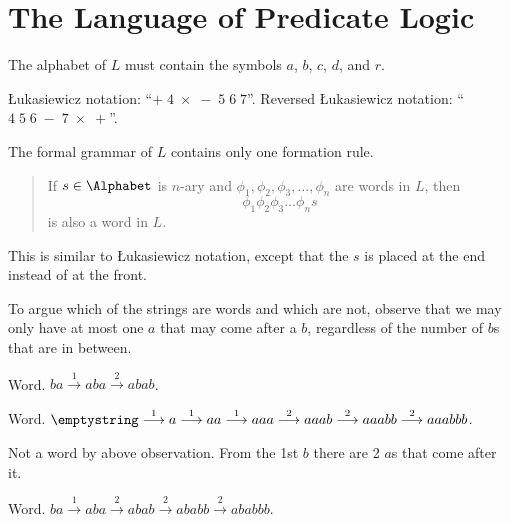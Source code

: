 \section{The Language of Predicate Logic}
\begin{questions}
    \item \begin{partquestions}{\alph*}
        \item The alphabet of $L$ must contain the symbols $a$, $b$, $c$, $d$, and $r$.
        \item {\L}ukasiewicz notation: ``$+\;4\;\times\;-\;5\;6\;7$''. Reversed {\L}ukasiewicz notation: ``$4\;5\;6\;-\;7\;\times\;+$''.
        \item The formal grammar of $L$ contains only one formation rule.
        \begin{quote}
            If $s \in \Alphabet$ is $n$-ary and $\phi_1, \phi_2, \phi_3, \dots, \phi_n$ are words in $L$, then
            \[
                \phi_1\phi_2\phi_3\dots\phi_ns
            \]
            is also a word in $L$.
        \end{quote}
        This is similar to {\L}ukasiewicz notation, except that the $s$ is placed at the end instead of at the front.
    \end{partquestions}

    \item To argue which of the strings are words and which are not, observe that we may only have at most one $a$ that may come after a $b$, regardless of the number of $b$s that are in between.
    \begin{partquestions}{\alph*}
        \item Word. $ba \overset{1}{\longrightarrow} aba \overset{2}{\longrightarrow} abab$.
        \item Word. $\emptystring \overset{1}{\longrightarrow} a \overset{1}{\longrightarrow} aa \overset{1}{\longrightarrow} aaa \overset{2}{\longrightarrow} aaab \overset{2}{\longrightarrow} aaabb \overset{2}{\longrightarrow} aaabbb$.
        \item Not a word by above observation. From the 1st $b$ there are 2 $a$s that come after it.
        \item Word. $ba \overset{1}{\longrightarrow} aba \overset{2}{\longrightarrow} abab \overset{2}{\longrightarrow} ababb \overset{2}{\longrightarrow} ababbb$.
    \end{partquestions}


\end{questions}
